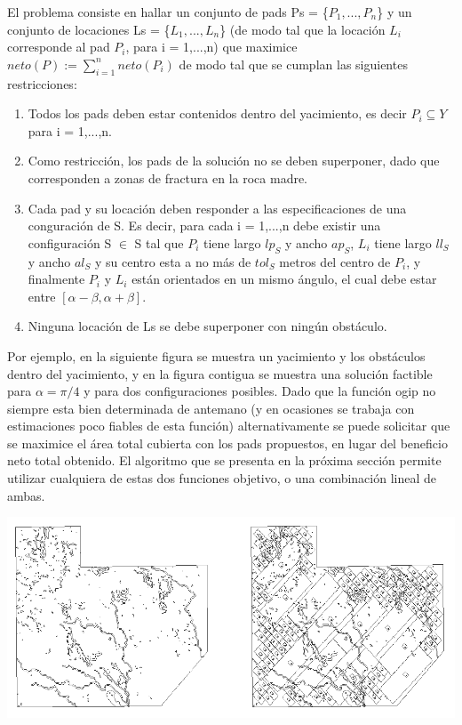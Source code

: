 El problema consiste en hallar un conjunto de pads Ps = \{$P_1, ... ,P_n$\} y un conjunto de locaciones Ls = \{$L_1, ..., L_n$\} (de modo tal que la locaci\'on $L_i$ corresponde al pad $P_i$, para i = 1,...,n) que maximice $neto(P) :=  \sum_{i=1}^{n} neto(P_i) $ de modo tal que se cumplan las siguientes restricciones:

\begin{enumerate}
\item Todos los pads deben estar contenidos dentro del yacimiento, es decir $P_i \subseteq Y$ para i = 1,...,n.
\item Como restricci\'on, los pads de la soluci\'on no se deben superponer, dado que corresponden a zonas de fractura en la roca madre.
\item Cada pad y su locaci\'on deben responder a las especificaciones de una conguraci\'on de S. Es decir, para cada i = 1,...,n debe existir una configuraci\'on S $\in$ S tal que $P_i$ tiene largo $lp_S$ y ancho $ap_S$, $L_i$ tiene largo $ll_S$ y ancho $al_S$ y su centro esta a no m\'as de $tol_S$ metros del centro de $P_i$, y finalmente $P_i$ y $L_i$ est\'an orientados en un mismo \'angulo, el cual debe estar entre $[\alpha - \beta, \alpha + \beta]$.
\item Ninguna locaci\'on de Ls se debe superponer con ning\'un obst\'aculo.
\end{enumerate}


Por ejemplo, en la siguiente figura se muestra un yacimiento y los obst\'aculos dentro del yacimiento, y en la figura contigua se muestra una soluci\'on factible para $\alpha = \pi / 4$ y para dos configuraciones posibles. Dado que la funci\'on ogip no siempre esta bien determinada de antemano (y en ocasiones se trabaja con estimaciones poco fiables de esta funci\'on) alternativamente se puede solicitar que se maximice el \'area total cubierta con los pads propuestos, en lugar del beneficio neto total obtenido. El algoritmo que se presenta en la pr\'oxima secci\'on permite utilizar cualquiera de estas dos funciones objetivo, o una combinaci\'on lineal de ambas.



\begin{center}
\includegraphics[width=1\textwidth]{imagenes/figura7}
\end{center}



